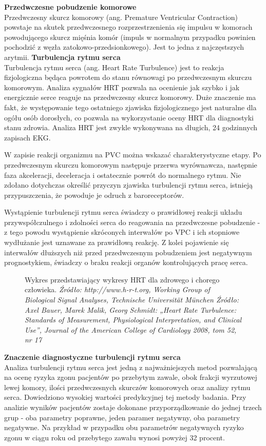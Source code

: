 \documentclass[a4paper, 11pt]{article}
\begin{document}
\textbf{Przedwczesne pobudzenie komorowe}\\
Przedwczesny skurcz komorowy (ang. Premature Ventricular
Contraction) powstaje na skutek przedwczesnego rozprzestrzenienia się
impulsu w komorach powodującego skurcz mięśnia komór (impuls w
normalnym przypadku powinien pochodzić z węzła zatokowo-przedsionkowego).
Jest to jedna z najczęstszych arytmii.
\textbf{Turbulencja rytmu serca}\\
Turbulencja rytmu serca (ang. Heart Rate Turbulence) jest to reakcja fizjologiczna będąca powrotem do stanu równowagi po przedwczesnym skurczu
komorowym. Analiza sygnałów HRT pozwala na ocenienie jak
szybko i jak energicznie serce reaguje na przedwczesny skurcz
komorowy. Duże znaczenie ma fakt, że występowanie tego
ostatniego zjawiska fizjologicznego jest naturalne dla ogółu osób
dorosłych, co pozwala na wykorzystanie oceny HRT dla
diagnostyki stanu zdrowia. Analiza HRT jest zwykle wykonywana
na długich, 24 godzinnych zapisach EKG.
\par W zapisie reakcji organizmu na PVC można wskazać charakterystyczne etapy. Po przedwczesnym skurczu komorowym następuje przerwa wyrównawcza, następnie faza akceleracji, deceleracja i ostatecznie powrót do normalnego rytmu.
Nie zdołano dotychczas określić przyczyn zjawiska turbulencji rytmu serca, istnieją przypuszczenia, że powoduje je odruch z baroreceptorów.
\par Wystąpienie turbulencji rytmu serca świadczy o prawidłowej reakcji 
układu przywspółczulnego i zdolności serca do reagowania na przedwczesne pobudzenie - z tego powodu wystąpienie skróconych interwałów po VPC i ich stopniowe wydłużanie jest uznawane za prawidłową reakcję. Z kolei pojawienie się interwałów dłuższych niż przed 
przedwczesnym pobudzeniem jest negatywnym prognostykiem, świadczy o braku
reakcji organów kontrolujących pracę serca.

\begin{figure}[h!]
\centering
\caption{Wykres przedstawiający wykresy HRT dla zdrowego i chorego człowieka. 
\textit{Źródło: http://www.h-r-t.org, Working Group of Biological Signal Analyses, Technische Universität München Źródło: Axel Bauer, Marek Malik, Georg Schmidt: „Heart Rate Turbulence: Standards of Measurement, Physiological Interpretation, and Clinical Use”, Journal of the American College of Cardiology 2008, tom 52, nr 17} }
\end{figure}

\textbf{Znaczenie diagnostyczne turbulencji rytmu serca}\\
Analiza turbulencji rytmu serca jest jedną z najważniejszych metod pozwalającą na ocenę ryzyka zgonu pacjentów po przebytym zawale, obok frakcji wyrzutowej lewej komory, ilości przedwczesnych skurczów komorowych oraz analizy rytmu serca. Dowiedziono wysokiej wartości predykcyjnej tej metody badania.
Przy analizie wyników pacjentów zostaje dokonane przyporządkowanie do jednej trzech grup - oba parametry poprawne, jeden paramer negatywny, oba parametry negatywne.
Na przykład w przypadku obu parametrów negatywnych ryzyko zgonu w ciągu roku od przebytego zawału wynosi powyżej 32 procent.
\end{document}
